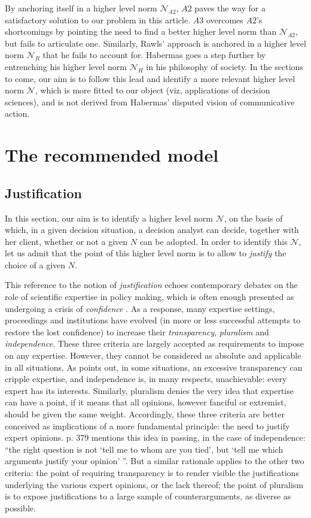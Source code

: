 \documentclass[preprint, french, english, 11pt, authoryear]{elsarticle}%
\newcommand{\adv}{\mathscr{N}}
\begin{document}
By anchoring itself in a higher level norm $\mathscr{N}_{A2}$, $A2$ paves the way for a satisfactory solution to our problem in this article. $A3$ overcomes $A2$'s shortcomings by pointing the need to find a better higher level norm than $\mathscr{N}_{A2}$, but fails to articulate one. Similarly, Rawls' approach is anchored in a higher level norm $\mathscr{N}_{R}$ that he fails to account for. Habermas goes a step further by entrenching his higher level norm $\mathscr{N}_{H}$ in his philosophy of society. In the sections to come, our aim is to follow this lead and identify a more relevant higher level norm $\adv$, which is more fitted to our object (viz, applications of decision sciences), and is not derived from Habermas' disputed vision of communicative action.

\section{The recommended model}
\subsection{Justification}
In this section, our aim is to identify a higher level norm $\adv$, on the basis of which, in a given decision situation, a decision analyst can decide, together with her client, whether or not a given $N$ can be adopted. In order to identify this $\adv$, let us admit that the point of this higher level norm is to allow to \emph{justify} the choice of a given $N$.

This reference to the notion of \emph{justification} echoes contemporary debates on the role of scientific expertise in policy making, which is often enough presented as undergoing a crisis of \emph{confidence} \citep{godard_environnement_2015}. As a response, many expertise settings, proceedings and institutions have evolved (in more or less successful attempts to restore the lost confidence) to increase their \emph{transparency}, \emph{pluralism} and \emph{independence}. These three criteria are largely accepted as requirements to impose on any expertise. However, they cannot be considered as absolute and applicable in all situations. As \citet{godard_environnement_2015} points out, in some situations, an excessive transparency can cripple expertise, and independence is, in many respects, unachievable: every expert has its interests. Similarly, pluralism denies the very idea that expertise can have a point, if it means that all opinions, however fanciful or extremist, should be given the same weight. Accordingly, these three criteria are better conceived as implications of a more fundamental principle: the need to justify expert opinions. \citet{godard_environnement_2015} p. 379 mentions this idea in passing, in the case of independence: “the right question is not `tell me to whom are you tied', but `tell me which arguments justify your opinion' ”. But a similar rationale applies to the other two criteria: the point of requiring transparency is to render visible the justifications underlying the various expert opinions, or the lack thereof; the point of pluralism is to expose justifications to a large sample of counterarguments, as diverse as possible.
\end{document}
